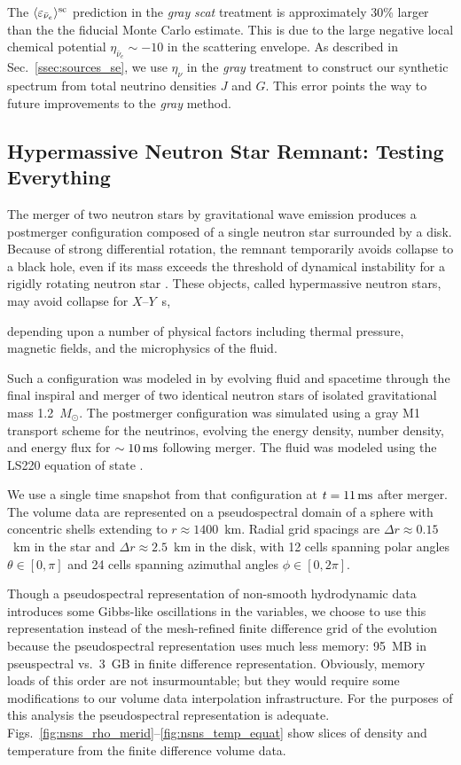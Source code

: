 \documentclass[aps,floatfix,prd,superscriptaddress,twocolumn]{revtex4-1}
\newcommand{\todo}[1]{\marginpar{\tiny{\textcolor{red}{#1}}}}
\renewcommand\todo[1]{} %
\begin{document}
The $\langle\varepsilon_{\bar{\nu}_e}\rangle^{\rm sc}$ prediction
in the \emph{gray} \emph{scat} treatment is approximately 30\%
larger than the the fiducial Monte Carlo estimate. This is
due to the large negative local chemical potential
$\eta_{\bar{\nu}_e}\sim-10$ in the scattering envelope.
As described in Sec.~\ref{ssec:sources_se},
we use $\eta_\nu$ in the \emph{gray} treatment to construct our
synthetic spectrum from total neutrino densities $J$ and $G$.
This error points the way to future improvements to the \emph{gray} method.

\subsection{Hypermassive Neutron Star Remnant:
  Testing Everything}
\label{ssec:test_disk_comparison}
The merger of two neutron stars by gravitational wave emission produces a
postmerger configuration composed of a single neutron star surrounded by a disk.
Because of strong differential rotation, the remnant temporarily avoids
collapse to a black hole, even if its mass exceeds the threshold of dynamical
instability for a rigidly rotating neutron star \cite{duez2009-review}.
These objects, called hypermassive neutron stars,
may avoid collapse for $X\textrm{--}Y$~s,
\todo{cite $X$, $Y$}
depending upon a number of physical factors including thermal pressure,
magnetic fields, and the microphysics of the fluid.

Such a configuration was modeled in \cite{fouc2016-m1_nsns} by
evolving fluid and spacetime through the
final inspiral and merger of two identical neutron stars of
isolated gravitational mass 1.2~$M_{\odot}$. The postmerger configuration
was simulated using a gray M1 transport scheme for the neutrinos, evolving the
energy density, number density, and energy flux \cite{fouc2016-m1_evolve_n}
for $\sim10\,{\rm ms}$ following merger.
The fluid was modeled using the LS220 equation of state \cite{latt1991-nuc_eos}.

We use a single time snapshot from that configuration
at $t=11\,{\rm ms}$ after merger.
The volume data are represented on a pseudospectral domain of a
sphere with concentric shells extending to $r\approx1400$~km.
Radial grid spacings are $\Delta r \approx 0.15$~km in the star
and $\Delta r \approx 2.5$~km in the disk,
with 12 cells spanning polar angles $\theta\in[0,\pi]$
and 24 cells spanning azimuthal angles $\phi\in[0,2\pi]$.
\todo{way too-low angular resolution}
Though a pseudospectral representation of non-smooth hydrodynamic data
introduces some Gibbs-like oscillations in the variables,
we choose to use this representation instead of the mesh-refined
finite difference grid of the evolution because the pseudospectral
representation uses much less memory:
95~MB in pseuspectral vs.\ 3~GB in finite difference representation.
Obviously, memory loads of this order are not insurmountable;
but they would require some modifications to our
volume data interpolation infrastructure.
For the purposes of this analysis the pseudospectral representation is adequate.
Figs.~\ref{fig:nsns_rho_merid}--\ref{fig:nsns_temp_equat}
show slices of density and temperature from the finite difference volume data.
\end{document}
